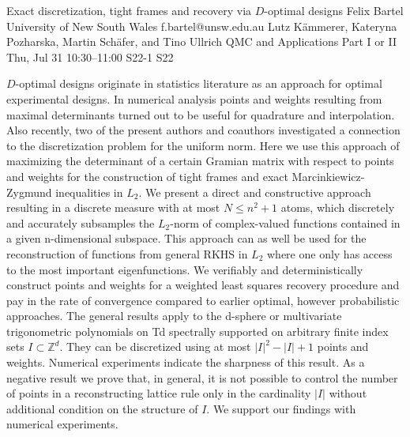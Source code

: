 \begin{talk}
  {Exact discretization, tight frames and recovery via $D$-optimal designs}%
  {Felix Bartel}%
  {University of New South Wales}%
  {f.bartel@unsw.edu.au}%
  {Lutz Kämmerer, Kateryna Pozharska, Martin Schäfer, and Tino Ullrich}%
  {QMC and Applications Part I or II}%
  {Thu, Jul 31 10:30–11:00}%
  {S22-1}%
  {S22}%
				
			
    $D$-optimal designs originate in statistics literature as an approach for optimal experimental designs. In numerical analysis points and weights resulting from maximal determinants turned out to be useful for quadrature and interpolation. Also recently, two of the present authors and coauthors investigated a connection to the discretization problem for the uniform norm. Here we use this approach of maximizing the determinant of a certain Gramian matrix with respect to points and weights for the construction of tight frames and exact Marcinkiewicz-Zygmund inequalities in $L_2$. We present a direct and constructive approach resulting in a discrete measure with at most $N\le n^2+1$ atoms, which discretely and accurately subsamples the $L_2$-norm of complex-valued functions contained in a given n-dimensional subspace. This approach can as well be used for the reconstruction of functions from general RKHS in $L_2$ where one only has access to the most important eigenfunctions. We verifiably and deterministically construct points and weights for a weighted least squares recovery procedure and pay in the rate of convergence compared to earlier optimal, however probabilistic approaches. The general results apply to the d-sphere or multivariate trigonometric polynomials on Td spectrally supported on arbitrary finite index sets $I\subset\mathbb Z^d$. They can be discretized using at most $|I|^2-|I|+1$ points and weights. Numerical experiments indicate the sharpness of this result. As a negative result we prove that, in general, it is not possible to control the number of points in a reconstructing lattice rule only in the cardinality $|I|$ without additional condition on the structure of $I$. We support our findings with numerical experiments.

\medskip

\end{talk}

